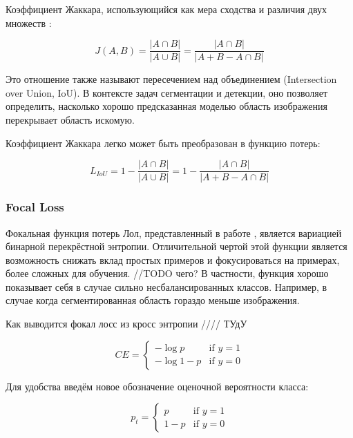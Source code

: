 Коэффициент Жаккара, использующийся как мера 
сходства и различия двух множеств \cite{IoU-Loss}:

\begin{equation}
    J(A,B) = \frac{|A \cap B|}{|A \cup B|} = \frac{|A \cap B|}{|A + B - A \cap B|}
\end{equation}

Это отношение также называют пересечением над объединением 
(Intersection over Union, IoU). В контексте задач сегментации и детекции, 
оно позволяет определить, насколько 
хорошо предсказанная моделью область изображения перекрывает
область искомую.

Коэффициент Жаккара легко может быть преобразован в функцию потерь\cite{IoU-Loss-2}:

\begin{equation}
    L_{IoU} = 1- \frac{|A \cap B|}{|A \cup B|} = 1 - \frac{|A \cap B|}{|A + B - A \cap B|}
\end{equation}


\subsubsection{Focal Loss}

Фокальная функция потерь Лол, представленный в работе \cite{Focal-Loss}, является вариацией бинарной перекрёстной энтропии.
Отличительной чертой этой функции является возможность снижать вклад простых примеров и фокусироваться на примерах, более сложных
для обучения. //TODO чего?
В частности, функция хорошо показывает себя в случае сильно несбалансированных классов.
Например, в случае когда сегментированная область гораздо меньше изображения.

Как выводится фокал лосс из кросс энтропии //// ТУдУ

\begin{equation}
    CE=\begin{cases}
        -\log{p} & \text{if }y=1\\
        -\log{1-p} & \text{if }y=0
     \end{cases}
\end{equation}

Для удобства введём новое обозначение оценочной вероятности класса:

\begin{equation}
    p_t=\begin{cases}
        p & \text{if }y=1\\
        1-p & \text{if }y=0
     \end{cases}
\end{equation}

